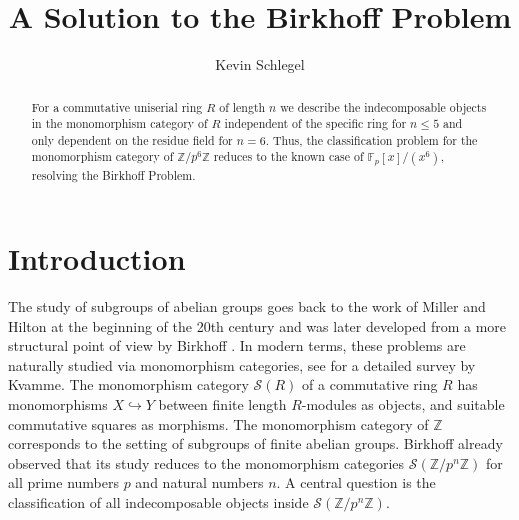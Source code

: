 \documentclass[a4paper]{amsart}
\numberwithin{equation}{section} \theoremstyle{plain}
\numberwithin{thm}{section}
\begin{document}
\title{A Solution to the Birkhoff Problem}
\author{Kevin Schlegel}
\date{}

\address{Faculty of Mathematics, Bielefeld University, 33615 Bielefeld, Germany}


\begin{abstract} For a commutative uniserial ring $R$ of length $n$ we describe the indecomposable objects in the monomorphism category of $R$ independent of the specific ring for $n\leq 5$ and only dependent on the residue field for $n = 6$. Thus, the classification problem for the monomorphism category of $\mathbb{Z}/p^6 \mathbb{Z}$ reduces to the known case of $\mathbb{F}_p[x]/(x^6)$, resolving the Birkhoff Problem.
\end{abstract}
\maketitle \section*{Introduction}
The study of subgroups of abelian groups goes back to the work of Miller \cite{miller, miller2} and Hilton \cite{hilton} at the beginning of the 20th century and was later developed from a more structural point of view by Birkhoff \cite{birkhoff}. In modern terms, these problems are naturally studied via monomorphism categories, see \cite{kvamme} for a detailed survey by Kvamme. The monomorphism category $\mathcal{S}(R)$ of a commutative ring $R$ has monomorphisms $X\hookrightarrow Y$ between finite length $R$-modules as objects, and suitable commutative squares as morphisms. The monomorphism category of $\mathbb{Z}$ corresponds to the setting of subgroups of finite abelian groups. Birkhoff  \cite{birkhoff} already observed that its study reduces to the monomorphism categories $\mathcal{S}(\mathbb{Z}/p^n \mathbb{Z})$ for all prime numbers $p$ and natural numbers $n$. A central question is the classification of all indecomposable objects inside $\mathcal{S}(\mathbb{Z}/p^n \mathbb{Z})$. 
\end{document}
